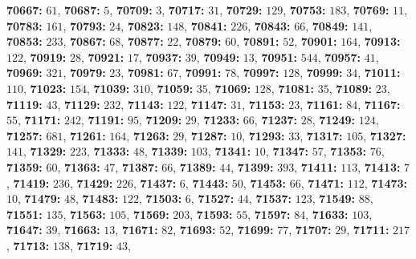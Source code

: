 \textsf{\bfseries 70667:} $61$, \textsf{\bfseries 70687:} $5$, \textsf{\bfseries 70709:} $3$, \textsf{\bfseries 70717:} $31$, \textsf{\bfseries 70729:} $129$, \textsf{\bfseries 70753:} $183$, \textsf{\bfseries 70769:} $11$, \textsf{\bfseries 70783:} $161$, \textsf{\bfseries 70793:} $24$, \textsf{\bfseries 70823:} $148$, \textsf{\bfseries 70841:} $226$, \textsf{\bfseries 70843:} $66$, \textsf{\bfseries 70849:} $141$, \textsf{\bfseries 70853:} $233$, \textsf{\bfseries 70867:} $68$, \textsf{\bfseries 70877:} $22$, \textsf{\bfseries 70879:} $60$, \textsf{\bfseries 70891:} $52$, \textsf{\bfseries 70901:} $164$, \textsf{\bfseries 70913:} $122$, \textsf{\bfseries 70919:} $28$, \textsf{\bfseries 70921:} $17$, \textsf{\bfseries 70937:} $39$, \textsf{\bfseries 70949:} $13$, \textsf{\bfseries 70951:} $544$, \textsf{\bfseries 70957:} $41$, \textsf{\bfseries 70969:} $321$, \textsf{\bfseries 70979:} $23$, \textsf{\bfseries 70981:} $67$, \textsf{\bfseries 70991:} $78$, \textsf{\bfseries 70997:} $128$, \textsf{\bfseries 70999:} $34$, \textsf{\bfseries 71011:} $110$, \textsf{\bfseries 71023:} $154$, \textsf{\bfseries 71039:} $310$, \textsf{\bfseries 71059:} $35$, \textsf{\bfseries 71069:} $128$, \textsf{\bfseries 71081:} $35$, \textsf{\bfseries 71089:} $23$, \textsf{\bfseries 71119:} $43$, \textsf{\bfseries 71129:} $232$, \textsf{\bfseries 71143:} $122$, \textsf{\bfseries 71147:} $31$, \textsf{\bfseries 71153:} $23$, \textsf{\bfseries 71161:} $84$, \textsf{\bfseries 71167:} $55$, \textsf{\bfseries 71171:} $242$, \textsf{\bfseries 71191:} $95$, \textsf{\bfseries 71209:} $29$, \textsf{\bfseries 71233:} $66$, \textsf{\bfseries 71237:} $28$, \textsf{\bfseries 71249:} $124$, \textsf{\bfseries 71257:} $681$, \textsf{\bfseries 71261:} $164$, \textsf{\bfseries 71263:} $29$, \textsf{\bfseries 71287:} $10$, \textsf{\bfseries 71293:} $33$, \textsf{\bfseries 71317:} $105$, \textsf{\bfseries 71327:} $141$, \textsf{\bfseries 71329:} $223$, \textsf{\bfseries 71333:} $48$, \textsf{\bfseries 71339:} $103$, \textsf{\bfseries 71341:} $10$, \textsf{\bfseries 71347:} $57$, \textsf{\bfseries 71353:} $76$, \textsf{\bfseries 71359:} $60$, \textsf{\bfseries 71363:} $47$, \textsf{\bfseries 71387:} $66$, \textsf{\bfseries 71389:} $44$, \textsf{\bfseries 71399:} $393$, \textsf{\bfseries 71411:} $113$, \textsf{\bfseries 71413:} $7$, \textsf{\bfseries 71419:} $236$, \textsf{\bfseries 71429:} $226$, \textsf{\bfseries 71437:} $6$, \textsf{\bfseries 71443:} $50$, \textsf{\bfseries 71453:} $66$, \textsf{\bfseries 71471:} $112$, \textsf{\bfseries 71473:} $10$, \textsf{\bfseries 71479:} $48$, \textsf{\bfseries 71483:} $122$, \textsf{\bfseries 71503:} $6$, \textsf{\bfseries 71527:} $44$, \textsf{\bfseries 71537:} $123$, \textsf{\bfseries 71549:} $88$, \textsf{\bfseries 71551:} $135$, \textsf{\bfseries 71563:} $105$, \textsf{\bfseries 71569:} $203$, \textsf{\bfseries 71593:} $55$, \textsf{\bfseries 71597:} $84$, \textsf{\bfseries 71633:} $103$, \textsf{\bfseries 71647:} $39$, \textsf{\bfseries 71663:} $13$, \textsf{\bfseries 71671:} $82$, \textsf{\bfseries 71693:} $52$, \textsf{\bfseries 71699:} $77$, \textsf{\bfseries 71707:} $29$, \textsf{\bfseries 71711:} $217$, \textsf{\bfseries 71713:} $138$, \textsf{\bfseries 71719:} $43$, 
